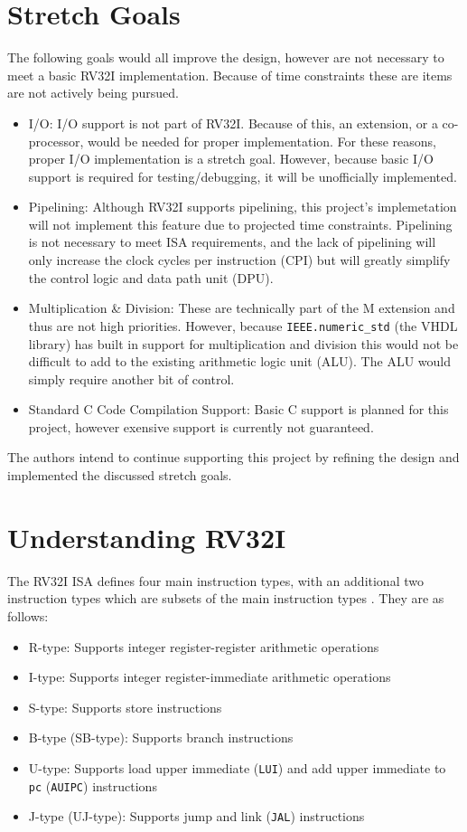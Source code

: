 \documentclass[lettersize,journal]{IEEEtran}
\begin{document}
\section{Stretch Goals}
The following goals would all improve the design, however are not necessary to meet a basic RV32I implementation.
Because of time constraints these are items are not actively being pursued.
\begin{itemize}
    \item I/O: I/O support is not part of RV32I. Because of this, an extension, or a co-processor, would be needed for proper implementation.
        For these reasons, proper I/O implementation is a stretch goal. However, because basic I/O support is required for testing/debugging, it will be unofficially
        implemented.
    \item Pipelining: Although RV32I supports pipelining, this project's implemetation will not implement this feature due to projected time constraints.
        Pipelining is not necessary to meet ISA requirements, and the lack of pipelining will only increase the clock cycles per instruction (CPI) but will greatly
        simplify the control logic and data path unit (DPU).
    \item Multiplication \& Division: These are technically part of the M extension \cite{riscvunprovisioned} and thus are not high priorities.
        However, because \verb|IEEE.numeric_std| (the VHDL library) has built in support for multiplication and division this would not be difficult to add to
        the existing arithmetic logic unit (ALU). The ALU would simply require another bit of control.
    \item Standard C Code Compilation Support: Basic C support is planned for this project, however exensive support is currently not guaranteed.
\end{itemize}

The authors intend to continue supporting this project by refining the design and implemented the discussed stretch goals.
 
\section{Understanding RV32I}
The RV32I ISA defines four main instruction types, with an additional two instruction types which are subsets of the main instruction types \cite{riscvunprovisioned}.
They are as follows:
\begin{itemize}
  \item R-type: Supports integer register-register arithmetic operations
  \item I-type: Supports integer register-immediate arithmetic operations
  \item S-type: Supports store instructions
  \item B-type (SB-type): Supports branch instructions
  \item U-type: Supports load upper immediate (\verb|LUI|) and add upper immediate to \verb|pc| (\verb|AUIPC|) instructions
  \item J-type (UJ-type): Supports jump and link (\verb|JAL|) instructions
\end{itemize}
\end{document}
